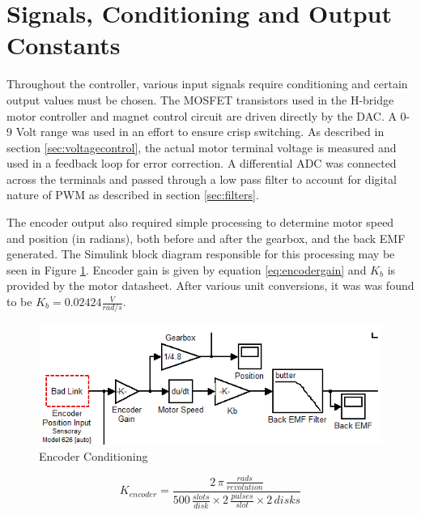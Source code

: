 \section{Signals, Conditioning and Output Constants}

Throughout the controller, various input signals require conditioning and certain output values must be chosen.
The MOSFET transistors used in the H-bridge motor controller and magnet control circuit are driven directly by the DAC.
A 0-9 Volt range was used in an effort to ensure crisp switching. %
As described in section \ref{sec:voltagecontrol}, the actual motor terminal voltage is measured and used in a feedback loop for error correction. 
A differential ADC was connected across the terminals and passed through a low pass filter to account for digital nature of PWM as described in section \ref{sec:filters}.

The encoder output also required simple processing to determine motor speed and position (in radians), both before and after the gearbox, and the back EMF generated.
The Simulink block diagram responsible for this processing may be seen in Figure \ref{fig:simulinkencoder}.
Encoder gain is given by equation \ref{eq:encodergain} and $K_b$ is provided by the motor datasheet. 
After various unit conversions, it was was found to be $K_b = 0.02424 \frac{V}{rad/s}$.

\begin{figure}[htp]
    \centering
    \includegraphics[scale=0.75]{images/Conditioning.PNG}
    \caption{Encoder Conditioning}
    \label{fig:simulinkencoder}
\end{figure}

\begin{equation}
	\label{eq:encodergain}
	K_{encoder} = {\frac {2\,\pi\,{\frac {rads}{revolution}}}{500\,{\frac {slots}{disk}}\times2\,{\frac {pulses}{slot}}\times2\,disks}}
\end{equation}
